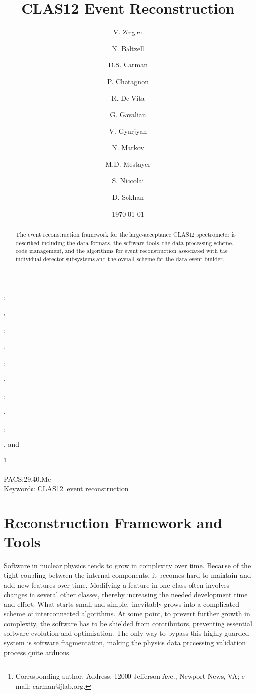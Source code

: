 \documentclass{elsart}
\begin{document}
\begin{frontmatter}

\title{CLAS12 Event Reconstruction}

\author[JLab]{V. Ziegler},
\author[JLab]{N. Baltzell},
\author[JLab]{D.S. Carman},
\author[Saclay]{P. Chatagnon},
\author[INFN]{R. De Vita},
\author[JLab]{G. Gavalian},
\author[JLab]{V. Gyurjyan},
\author[JLab]{N. Markov},
\author[JLab]{M.D. Mestayer}, 
\author[Saclay]{S. Niccolai}, and
\author[Glasgow]{D. Sokhan}

\address[JLab]{Thomas Jefferson National Accelerator Facility, Newport News, VA 23606, USA}
\address[INFN]{INFN, Sezione di Genova, 16146 Genova, Italy}
\address[Saclay]{Institut de Physique Nucl\'eaire, CNRS-IN2P3, Univ. Paris-Sud, Universit\'e Paris-Saclay,
  91406 Orsay Cedex, France}
\address[Glasgow]{University of Glasgow, Glasgow G12 8QQ, United Kingdom}
\thanks[corresponding]{Corresponding author. Address: 12000 Jefferson Ave., Newport News, VA; 
e-mail: carman@jlab.org.}

\date{\today}


\begin{abstract}
  The event reconstruction framework for the large-acceptance CLAS12 spectrometer is described including
  the data formats, the software tools, the data processing scheme, code management, and the algorithms
  for event reconstruction associated with the individual detector subsystems and the overall scheme for the
  data event builder.
\end{abstract}

\end{frontmatter}

PACS:29.40.Mc \\
Keywords: CLAS12, event reconstruction
\newpage

\newpage
\tableofcontents

\vfil
\eject

\section{Reconstruction Framework and Tools}

Software in nuclear physics tends to grow in complexity over time. Because of the tight coupling between
the internal components, it becomes hard to maintain and add new features over time. Modifying a feature
in one class often involves changes in several other classes, thereby increasing the needed development
time and effort. What starts small and simple, inevitably grows into a complicated scheme of interconnected
algorithms. At some point, to prevent further growth in complexity, the software has to be shielded from
contributors, preventing essential software evolution and optimization. The only way to bypass this highly
guarded system is software fragmentation, making the physics data processing validation process quite
arduous.
\end{document}
